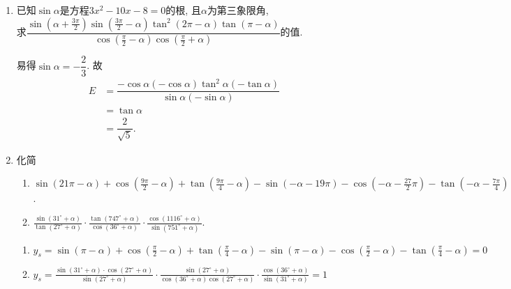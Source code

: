 \begin{enumerate}
\item 已知$\sin\alpha$是方程$3x^2-10x-8=0$的根, 且$\alpha$为第三象限角, \\
求$\dfrac{\sin(\alpha+\frac{3\pi}{2})\sin(\frac{3\pi}{2}-\alpha)\tan^2(2\pi-\alpha)\tan(\pi-\alpha)}
{\cos(\frac{\pi}{2}-\alpha)\cos(\frac{\pi}{2}+\alpha)}$的值. 
\begin{jieda}
易得$\sin\alpha=-\dfrac{2}{3}$. 
故
\begin{align*}
E & = \dfrac{-\cos\alpha(-\cos\alpha)\tan^2\alpha(-\tan\alpha)}{\sin\alpha(-\sin\alpha)}\\
& = \tan\alpha\\
& = \dfrac{2}{\sqrt{5}}.
\end{align*}
\end{jieda}


\item 化简
\begin{enumerate}
    \item $\sin (21 \pi-\alpha)+\cos \left(\frac{9 \pi}{2}-\alpha\right)+\tan \left(\frac{9 \pi}{4}-\alpha\right)-\sin (-\alpha-19 \pi)-\cos \left(-\alpha-\frac{27}{2} \pi\right)-\tan \left(-\alpha-\frac{7 \pi}{4}\right)$.
    \item $\frac{\sin \left(31^{\circ}+\alpha\right)}{\tan \left(27^{\circ}+\alpha\right)} \cdot \frac{\tan \left(747^{\circ}+\alpha\right)}{\cos \left(36^{\circ}+\alpha\right)} \cdot \frac{\cos \left(1116^{\circ}+\alpha\right)}{\sin \left(751^{\circ}+\alpha\right)}$.
\end{enumerate}
\begin{jieda}
    \begin{enumerate}
\item $ y_s=\sin (\pi-\alpha)+\cos \left(\frac{\pi}{2}-\alpha\right)+\tan \left(\frac{\pi}{4}-\alpha\right)-\sin (\pi-\alpha)-\cos \left(\frac{\pi}{2}-\alpha\right)-\tan \left(\frac{\pi}{4}-\alpha\right)=0 $
\item $y_s=\frac{\sin \left(31^{\circ}+\alpha\right) \cdot \cos \left(27^{\circ}+\alpha\right)}{\sin \left(27^{\circ}+\alpha\right)} \cdot \frac{\sin \left(27^{\circ}+\alpha\right)}{\cos \left(36^{\circ}+\alpha\right) \cos \left(27^{\circ}+\alpha\right)} \cdot \frac{\cos \left(36^{\circ}+\alpha\right)}{\sin \left(31^{\circ}+\alpha\right)}=1$
\end{enumerate}
\end{jieda}




\end{enumerate}

